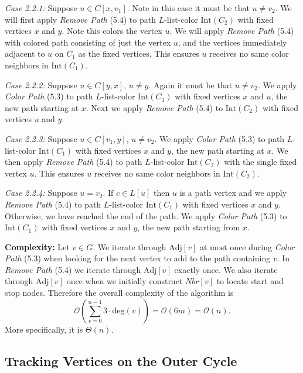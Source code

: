 \documentclass[letterpaper, 12pt]{article}
\theoremstyle{definition}
\theoremstyle{definition}
\theoremstyle{thm}
\theoremstyle{definition}
\begin{document}
\textit{Case 2.2.1:} Suppose $u\in C[x,v_1]$. Note in this case it must be that
$u\ne v_2$. We will first apply \textit{Remove Path} (5.4) to path $L$-list-color
$\text{Int}(C_2)$ with fixed vertices $x$ and $y$. Note this colors the vertex
$u$. We will apply \textit{Remove Path} (5.4) with colored path consisting of
just the vertex $u$, and the vertices immediately adjacent to $u$ on $C_1$ as
the fixed vertices. This ensures $u$ receives no same color neighbors in
$\text{Int}(C_1)$. 

\textit{Case 2.2.2:} Suppose $u\in C[y,x]$, $u\ne y$. Again it must be that
$u\ne v_2$. We apply \textit{Color Path} (5.3) to path $L$-list-color
$\text{Int}(C_1)$ with fixed vertices $x$ and $u$, the new path starting at $x$.
Next we apply \textit{Remove Path} (5.4) to $\text{Int}(C_2)$ with fixed
vertices $u$ and $y$.

\textit{Case 2.2.3:} Suppose $u\in C[v_1,y]$, $u\ne v_2$. We apply
\textit{Color Path} (5.3) to path $L$-list-color $\text{Int}(C_1)$ with fixed
vertices $x$ and $y$, the new path starting at $x$. We then apply \textit{Remove
Path} (5.4) to path $L$-list-color $\text{Int}(C_2)$ with the single fixed 
vertex $u$. This ensures $u$ receives no same color neighbors in
$\text{Int}(C_2)$.

\textit{Case 2.2.4:} Suppose $u= v_2$. If $c\in L[u]$ then $u$ is a path vertex
and we apply \textit{Remove Path} (5.4) to path $L$-list-color $\text{Int}(C_1)$
with fixed vertices $x$ and $y$. Otherwise, we have reached the end of the path.
We apply \textit{Color Path} (5.3) to $\text{Int}(C_1)$ with fixed vertices $x$
and $y$, the new path starting from $x$.

\noindent\textbf{Complexity:} Let $v\in G$. We iterate through $\text{Adj}[v]$
at most once during \textit{Color Path} (5.3) when looking for the next vertex
to add to the path containing $v$. In \textit{Remove Path} (5.4) we iterate through
$\text{Adj}[v]$ exactly once. We also iterate through $\text{Adj}[v]$ once
when we initially construct $\textit{Nbr}[v]$ to locate start and stop nodes.
Therefore the overall complexity of the algorithm is
\[
    \mathcal{O}\left(\sum_{v=0}^{n-1}3\cdot\text{deg}(v)\right)
        =\mathcal{O}(6m)=\mathcal{O}(n).
\]
More specifically, it is $\Theta(n)$.

\subsection{Tracking Vertices on the Outer Cycle}
\end{document}
